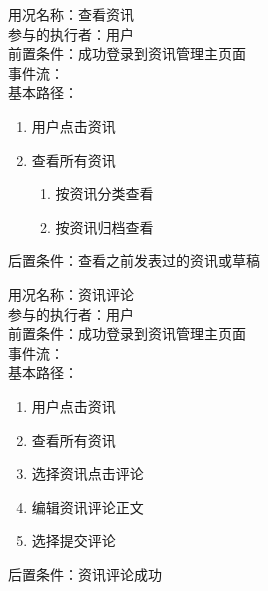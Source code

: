 \begin{framed}
\noindent
用况名称：查看资讯\\
参与的执行者：用户\\
前置条件：成功登录到资讯管理主页面\\
事件流：\\
基本路径：
\begin{enumerate}[itemsep=2pt,topsep=0pt,parsep=0pt,itemindent=1em]
    \item 用户点击资讯
    \item 查看所有资讯
    \begin{enumerate}[itemsep=2pt,topsep=0pt,parsep=0pt,itemindent=1em]
          \item 按资讯分类查看
          \item 按资讯归档查看
      \end{enumerate}
\end{enumerate}
\noindent
后置条件：查看之前发表过的资讯或草稿
\end{framed}

\begin{framed}
\noindent
用况名称：资讯评论\\
参与的执行者：用户\\
前置条件：成功登录到资讯管理主页面\\
事件流：\\
基本路径：
\begin{enumerate}[itemsep=2pt,topsep=0pt,parsep=0pt,itemindent=1em]
    \item 用户点击资讯
    \item 查看所有资讯
    \item 选择资讯点击评论
    \item 编辑资讯评论正文
    \item 选择提交评论
    \end{enumerate}
\noindent
后置条件：资讯评论成功
\end{framed}


